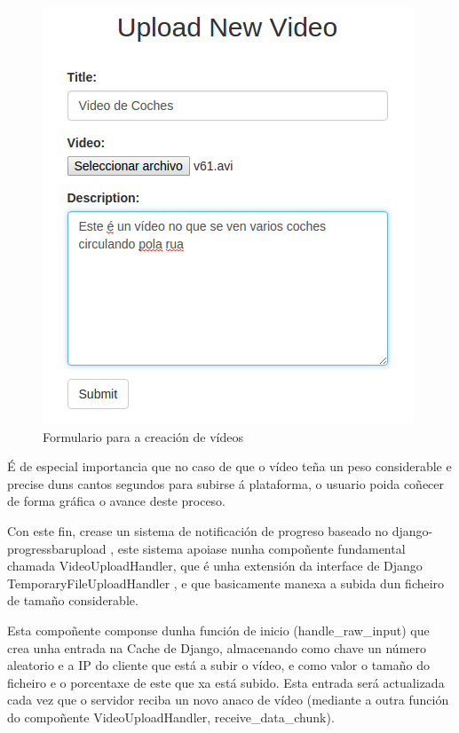         \begin{figure}[htp]
        \begin{center}
            \includegraphics[scale=0.6]{figures/SubidaVideoForm.png}
            \caption{Formulario para a creación de vídeos}
        \label{fig:SubidaVideoForm}
        \end{center}
        \end{figure}    
        
        É de especial importancia que no caso de que o vídeo teña un peso considerable e precise 
        duns cantos segundos para subirse á plataforma, o usuario poida coñecer de forma gráfica
        o avance deste proceso.
        
        Con este fin, crease un sistema de notificación de progreso baseado no 
        django-progressbarupload \cite{django-progressbarupload}, este sistema apoiase nunha compoñente
        fundamental chamada VideoUploadHandler, que é unha extensión da interface de Django 
        TemporaryFileUploadHandler \cite{TemporaryFileUploadHandler}, e que basicamente manexa a subida
        dun ficheiro de tamaño considerable.
        
        Esta compoñente componse dunha función de inicio (handle\_raw\_input) que crea unha entrada 
        na Cache de Django, almacenando como chave un número aleatorio e a IP do cliente que está a
        subir o vídeo, e como valor o tamaño do ficheiro e o porcentaxe de este que xa está subido.
        Esta entrada será actualizada cada vez que o servidor reciba un novo anaco de vídeo (mediante
        a outra función do compoñente VideoUploadHandler, receive\_data\_chunk). 
        
